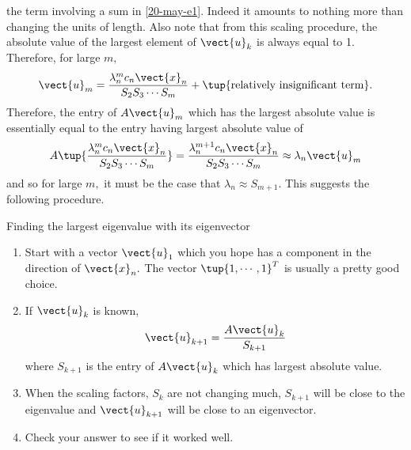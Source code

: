 the term involving a sum in \ref{20-may-e1}. Indeed it amounts to nothing more
than changing the units of length. Also note that from this scaling
procedure, the absolute value of the largest element of $\vect{u}_{k}$ is
always equal to 1. Therefore, for large $m,$
\begin{equation*}
\vect{u}_{m}=\vspace{0.05in}\frac{\lambda _{n}^{m}c_{n}\vect{x}_{n}}{S_{2}S_{3}\cdots S_{m}}+\tup{\text{relatively insignificant term}} .
\end{equation*}
Therefore, the entry of $A\vect{u}_{m}$ which has the largest absolute value
is essentially equal to the entry having largest absolute value of 
\begin{equation*}
A\tup{\vspace{0.05in}\frac{\lambda _{n}^{m}c_{n}\vect{x}_{n}}{S_{2}S_{3}\cdots S_{m}}} =\vspace{0.05in}\frac{\lambda _{n}^{m+1}c_{n}
\vect{x}_{n}}{S_{2}S_{3}\cdots S_{m}}\approx \lambda _{n}\vect{u}_{m}
\end{equation*}%
and so for large $m,$ it must be the case that $\lambda _{n}\approx S_{m+1}.$
This suggests the following procedure.

\begin{procedure}{Finding the largest eigenvalue with its eigenvector}{}
\begin{enumerate}
\item Start with a vector $\vect{u}_{1}$ which you hope has a component in
the direction of $\vect{x}_{n}.$ The vector $\tup{1,\cdots ,1} ^{T}$
is usually a pretty good choice.

\item If $\vect{u}_{k}$ is known, 
\begin{equation*}
\vect{u}_{k+1}=\frac{A\vect{u}_{k}}{S_{k+1}}
\end{equation*}
where $S_{k+1}$ is the entry of $A\vect{u}_{k}$ which has largest absolute
value.

\item When the scaling factors, $S_{k}$ are not changing much, $S_{k+1}$
will be close to the eigenvalue and $\vect{u}_{k+1}$ will be close to an
eigenvector.

\item Check your answer to see if it worked well.
\end{enumerate}
\end{procedure}

